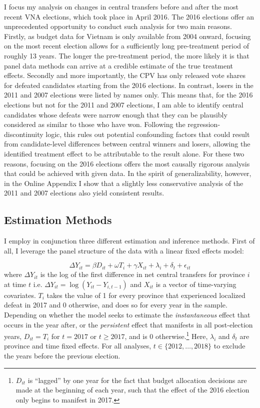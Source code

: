\documentclass[12pt]{article}
\newcommand\fnote[1]{\footnote{\baselineskip=2\normalbaselineskip#1}}
\newcommand{\1}{\mathbbm{1}}
\begin{document}
I focus my analysis on changes in central transfers before and after the most recent VNA elections, which took place in April 2016. The 2016 elections offer an unprecedented opportunity to conduct such analysis for two main reasons. Firstly, as budget data for Vietnam is only available from 2004 onward, focusing on the most recent election allows for a sufficiently long pre-treatment period of roughly 13 years. The longer the pre-treatment period, the more likely it is that panel data methods can arrive at a credible estimate of the true treatment effects. Secondly and more importantly, the CPV has only released vote shares for defeated candidates starting from the 2016 elections. In contrast, losers in the 2011 and 2007 elections were listed by names only. This means that, for the 2016 elections but not for the 2011 and 2007 elections, I am able to identify central candidates whose defeats were narrow enough that they can be plausibly considered as similar to those who have won. Following the regression-discontinuity logic, this rules out potential confounding factors that could result from candidate-level differences between central winners and losers, allowing the identified treatment effect to be attributable to the result alone. For these two reasons, focusing on the 2016 elections offers the most causally rigorous analysis that could be achieved with given data. In the spirit of generalizability, however, in the Online Appendix I show that a slightly less conservative analysis of the 2011 and 2007 elections also yield consistent results.

\subsection{Estimation Methods}
\label{sec:methods_estimation}
I employ in conjunction three different estimation and inference methods. First of all, I leverage the panel structure of the data with a linear fixed effects model:

\begin{equation}
\Delta Y_{it} = \beta D_{it} + \omega T_{i} + \gamma X_{it} + \lambda_i + \delta_t + \epsilon_{it} \label{eq:FE}
\end{equation}
where $\Delta Y_{it}$ is the log of the first difference in net central transfers for province $i$ at time $t$ i.e. $\Delta Y_{it} = \log(Y_{it} - Y_{i, t-1})$ and $X_{it}$ is a vector of time-varying covariates. $T_{i}$ takes the value of 1 for every province that experienced localized defeat in 2017 and 0 otherwise, and does so for every year in the sample. Depending on whether the model seeks to estimate the \textit{instantaneous} effect that occurs in the year after, or the \textit{persistent} effect that manifests in all post-election years, $D_{it} = T_{i}$ for $t=2017$ or $t\geq2017$, and is  $0$ otherwise.\fnote{$D_{it}$ is ``lagged'' by one year for the fact that budget allocation decisions are made at the beginning of each year, such that the effect of the 2016 election only begins to manifest in 2017.} Here, $\lambda_i$ and $\delta_t$ are province and time fixed effects. For all analyses, $t \in \{2012, \ldots, 2018\}$ to exclude the years before the previous election.
\end{document}
